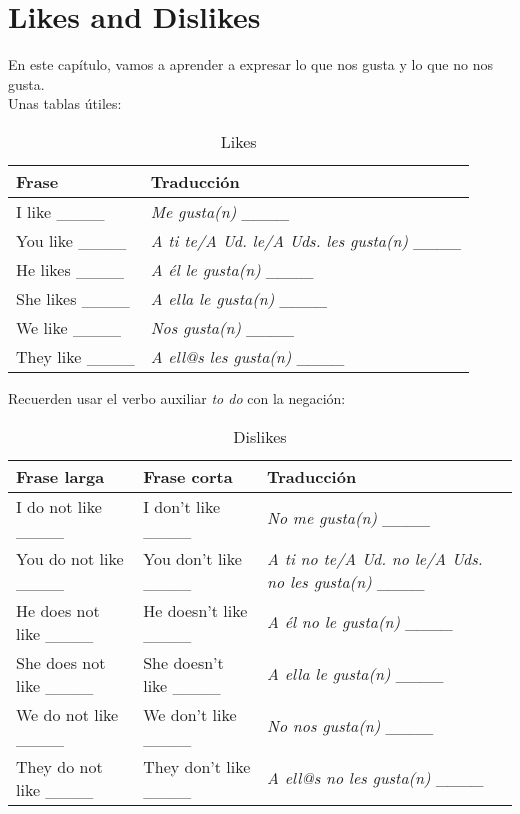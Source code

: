 \chapter{Likes and Dislikes}

En este capítulo, vamos a aprender a expresar lo que nos gusta y lo que no nos gusta. \\

Unas tablas útiles:

\begin{table}[H]
	\centering
	\begin{tabular}{ll}
		\toprule
		\textbf{Frase} & \textbf{Traducción} \\
		\midrule
		I like \_\_\_\_ & \emph{Me gusta(n) \_\_\_\_} \\
		You like \_\_\_\_ & \emph{A ti te/A Ud. le/A Uds. les gusta(n) \_\_\_\_} \\
		He likes \_\_\_\_ & \emph{A él le gusta(n) \_\_\_\_} \\
		She likes \_\_\_\_ & \emph{A ella le gusta(n) \_\_\_\_} \\
		We like \_\_\_\_ & \emph{Nos gusta(n) \_\_\_\_} \\
		They like \_\_\_\_ & \emph{A ell@s les gusta(n) \_\_\_\_} \\
		\bottomrule
	\end{tabular}
	\caption{Likes}
\end{table}

Recuerden usar el verbo auxiliar \emph{to do} con la negación:

\begin{table}[H]
	\centering
	\begin{tabular}{lll}
		\toprule
		\textbf{Frase larga} & \textbf{Frase corta} & \textbf{Traducción} \\
		\midrule
		I do not like \_\_\_\_ & I don't like \_\_\_\_ & \emph{No me gusta(n) \_\_\_\_} \\
		You do not like \_\_\_\_ & You don't like \_\_\_\_ & \emph{A ti no te/A Ud. no le/A Uds. no les gusta(n) \_\_\_\_} \\
		He does not like \_\_\_\_ & He doesn't like \_\_\_\_ & \emph{A él no le gusta(n) \_\_\_\_} \\
		She does not like \_\_\_\_ & She doesn't like \_\_\_\_& \emph{A ella le gusta(n) \_\_\_\_} \\
		We do not like \_\_\_\_ & We don't like \_\_\_\_ & \emph{No nos gusta(n) \_\_\_\_} \\
		They do not like \_\_\_\_ & They don't like \_\_\_\_ & \emph{A ell@s no les gusta(n) \_\_\_\_} \\
		\bottomrule
	\end{tabular}
	\caption{Dislikes}
\end{table}

